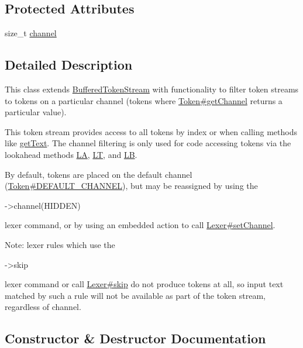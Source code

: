 \subsection*{Protected Attributes}
\begin{DoxyCompactItemize}
\item 
size\+\_\+t \hyperlink{classantlr4_1_1CommonTokenStream_aad59d04a125961d8ba1cffdf4a1a0bcf}{channel}
\end{DoxyCompactItemize}


\subsection{Detailed Description}
This class extends \hyperlink{classantlr4_1_1BufferedTokenStream}{Buffered\+Token\+Stream} with functionality to filter token streams to tokens on a particular channel (tokens where \hyperlink{classantlr4_1_1Token_a92991c0566e4cb00ae2c5f9e7d8fe6b4}{Token\#get\+Channel} returns a particular value).

This token stream provides access to all tokens by index or when calling methods like \hyperlink{}{get\+Text}. The channel filtering is only used for code accessing tokens via the lookahead methods \hyperlink{}{LA}, \hyperlink{}{LT}, and \hyperlink{}{LB}.

By default, tokens are placed on the default channel (\hyperlink{classantlr4_1_1Token_a699cbc56affbddc079561e175cba8435}{Token\#\+D\+E\+F\+A\+U\+L\+T\+\_\+\+C\+H\+A\+N\+N\+EL}), but may be reassigned by using the 
\begin{DoxyCode}
->channel(HIDDEN) 
\end{DoxyCode}
 lexer command, or by using an embedded action to call \hyperlink{}{Lexer\#set\+Channel}. 

Note\+: lexer rules which use the
\begin{DoxyCode}
->skip 
\end{DoxyCode}
 lexer command or call \hyperlink{classantlr4_1_1Lexer_a8d2585d70adce01584a505a25c3e179d}{Lexer\#skip} do not produce tokens at all, so input text matched by such a rule will not be available as part of the token stream, regardless of channel.

\subsection{Constructor \& Destructor Documentation}
\mbox{\label{classantlr4_1_1CommonTokenStream_a70ef318ad41bc2f99f44549027f886e1}} 
